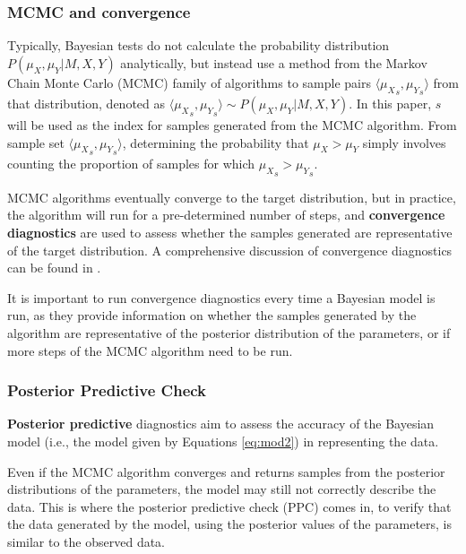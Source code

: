 \documentclass[twoside,11pt,preprint]{article}
\begin{document}
\hypertarget{mcmc-and-convergence}{%
\subsubsection{\texorpdfstring{MCMC and convergence \label{sec:mcmc1}}{MCMC and convergence }}\label{mcmc-and-convergence}}

Typically, Bayesian tests do not calculate the probability distribution
\(P(\mu_X,\mu_Y | M, X, Y)\) analytically, but instead use a method from the Markov Chain Monte Carlo (MCMC) family of algorithms to sample pairs \(\langle {\mu_X}_s,{\mu_Y}_s \rangle\) from that distribution, denoted as \(\langle {\mu_X}_s,{\mu_Y}_s \rangle \sim P(\mu_X,\mu_Y | M, X, Y)\). In this paper, \(s\) will be used as the index for samples generated from the MCMC algorithm. From sample set \(\langle {\mu_X}_s,{\mu_Y}_s \rangle\), determining the probability that \(\mu_X > \mu_Y\) simply involves counting the proportion of samples for which \({\mu_X}_s > {\mu_Y}_s\).

MCMC algorithms eventually converge to the target distribution, but in practice, the algorithm will run for a pre-determined number of steps, and \textbf{convergence diagnostics} are used to assess whether the samples generated are representative of the target distribution. A comprehensive discussion of convergence diagnostics can be found in \citet{mcmcdiag}.

It is important to run convergence diagnostics every time a Bayesian model is run, as they provide information on whether the samples generated by the algorithm are representative of the posterior distribution of the parameters, or if more steps of the MCMC algorithm need to be run.

\hypertarget{posterior-predictive-check}{%
\subsubsection{Posterior Predictive Check}\label{posterior-predictive-check}}

\textbf{Posterior predictive} diagnostics aim to assess the accuracy of the Bayesian model (i.e., the model given by Equations \ref{eq:mod2}) in representing the data.

Even if the MCMC algorithm converges and returns samples from the posterior distributions of the parameters, the model may still not correctly describe the data. This is where the posterior predictive check (PPC) comes in, to verify that the data generated by the model, using the posterior values of the parameters, is similar to the observed data.
\end{document}
